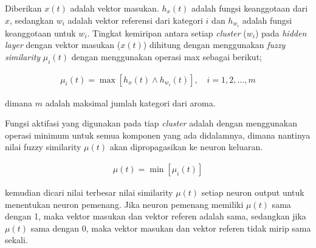 
Diberikan $x(t)$ adalah vektor masukan. $h_x(t)$ adalah fungsi keanggotaan dari
$x$, sedangkan $w_i$ adalah vektor referensi dari kategori $i$ dan $h_{w_i}$
adalah fungsi keanggotaan untuk $w_i$. Tingkat kemiripan antara setiap
\emph{cluster} ($w_i$) pada \emph{hidden layer} dengan vektor masukan ($x(t)$)
dihitung dengan menggunakan \emph{fuzzy similarity} $\mu_i(t)$ dengan
menggunakan operasi max sebagai berikut;

\begin{align}
\mu_i(t) = \max [h_x(t) \wedge h_{w_i}(t)], \quad i = 1, 2, \dots, m
\end{align}

\noindent dimana $m$ adalah maksimal jumlah kategori dari aroma.

Fungsi aktifasi yang digunakan pada tiap \emph{cluster} adalah dengan
menggunakan operasi minimum untuk semua komponen yang ada didalamnya, 
dimana nantinya nilai fuzzy similarity $\mu(t)$ akan dipropagasikan ke neuron
keluaran.

\begin{align}
\mu(t) = \min [\mu_i(t)]
\end{align}

\noindent kemudian dicari nilai terbesar nilai similarity $\mu(t)$
setiap neuron output untuk menentukan neuron pemenang. Jika neuron pemenang
memiliki $\mu(t)$ sama dengan 1, maka vektor masukan dan vektor
referen adalah sama, sedangkan jika $\mu(t)$ sama dengan 0, maka vektor
masukan dan vektor referen tidak mirip sama sekali.

